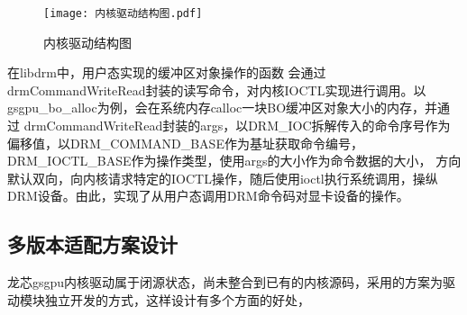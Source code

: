 \begin{figure}[h]
  \centering
  \texttt{[image: 内核驱动结构图.pdf]}
  \caption{内核驱动结构图}
  \label{fig:内核驱动结构图}
\end{figure}

在libdrm中，用户态实现的缓冲区对象操作的函数
会通过drmCommandWriteRead封装的读写命令，对内核IOCTL实现进行调用。以gsgpu\_bo\_alloc为例，会在系统内存calloc一块BO缓冲区对象大小的内存，并通过
drmCommandWriteRead封装的args，以DRM\_IOC拆解传入的命令序号作为偏移值，以DRM\_COMMAND\_BASE作为基址获取命令编号，DRM\_IOCTL\_BASE作为操作类型，使用args的大小作为命令数据的大小，
方向默认双向，向内核请求特定的IOCTL操作，随后使用ioctl执行系统调用，操纵DRM设备。由此，实现了从用户态调用DRM命令码对显卡设备的操作。


\subsection{多版本适配方案设计}
龙芯gsgpu内核驱动属于闭源状态，尚未整合到已有的内核源码，采用的方案为驱动模块独立开发的方式，这样设计有多个方面的好处，

